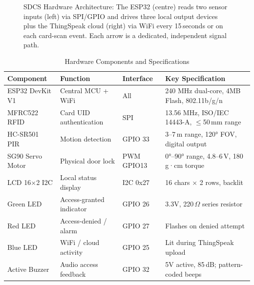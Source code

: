 \documentclass[12pt,a4paper]{article}
\begin{document}
\begin{figure}[!ht]
{}
\caption{SDCS Hardware Architecture: The ESP32 (centre) reads
two sensor inputs (left) via SPI/GPIO and drives three local
output devices plus the ThingSpeak cloud (right) via WiFi every
15\,seconds or on each card-scan event. Each arrow is a dedicated,
independent signal path.}
\label{fig:arch}
\end{figure}

\begin{table}[!ht]
\centering
\caption{Hardware Components and Specifications}
\label{tab:hardware}
\renewcommand{\arraystretch}{1.3}
\begin{tabularx}{\textwidth}{L{2.8cm} L{3.2cm} C{1.6cm} X}
\toprule
\textbf{Component} & \textbf{Function} & \textbf{Interface} &
\textbf{Key Specification} \\
\midrule
{}
ESP32 DevKit V1   & Central MCU + WiFi       & All      & 240 MHz dual-core, 4MB Flash, 802.11b/g/n \\
MFRC522 RFID      & Card UID authentication  & SPI      & 13.56 MHz, ISO/IEC 14443-A, $\leq$50\,mm range \\
HC-SR501 PIR      & Motion detection          & GPIO 33  & 3--7\,m range, 120° FOV, digital output \\
SG90 Servo Motor  & Physical door lock        & PWM GPIO13 & 0°--90° range, 4.8--6\,V, 180\,g·cm torque \\
LCD 16$\times$2 I2C & Local status display   & I2C 0x27 & 16 chars $\times$ 2 rows, backlit \\
Green LED         & Access-granted indicator  & GPIO 26  & 3.3V, 220\,$\Omega$ series resistor \\
Red LED           & Access-denied / alarm     & GPIO 27  & Flashes on denied attempt \\
Blue LED          & WiFi / cloud activity     & GPIO 25  & Lit during ThingSpeak upload \\
Active Buzzer     & Audio access feedback     & GPIO 32  & 5V active, 85\,dB; pattern-coded beeps \\
\bottomrule
\end{tabularx}
\end{table}
\end{document}
